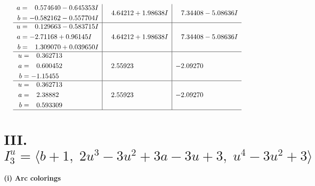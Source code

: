 \documentclass[1p]{elsarticle_modified}
\theoremstyle{definition}
\begin{document}
$$\begin{array}{c|c|c}
\begin{aligned}
a &= \phantom{-}0.574640 - 0.645353 I \\
b &= -0.582162 - 0.557704 I\end{aligned}
 & \phantom{-}4.64212 + 1.98638 I & \phantom{-}7.34408 - 5.08636 I \\ \hline\begin{aligned}
u &= \phantom{-}0.129663 - 0.583715 I \\
a &= -2.71168 + 0.96145 I \\
b &= \phantom{-}1.309070 + 0.039650 I\end{aligned}
 & \phantom{-}4.64212 + 1.98638 I & \phantom{-}7.34408 - 5.08636 I \\ \hline\begin{aligned}
u &= \phantom{-}0.362713\phantom{ +0.000000I} \\
a &= \phantom{-}0.600452\phantom{ +0.000000I} \\
b &= -1.15455\phantom{ +0.000000I}\end{aligned}
 & \phantom{-}2.55923\phantom{ +0.000000I} & -2.09270\phantom{ +0.000000I} \\ \hline\begin{aligned}
u &= \phantom{-}0.362713\phantom{ +0.000000I} \\
a &= \phantom{-}2.38882\phantom{ +0.000000I} \\
b &= \phantom{-}0.593309\phantom{ +0.000000I}\end{aligned}
 & \phantom{-}2.55923\phantom{ +0.000000I} & -2.09270\phantom{ +0.000000I}\\
 \hline 
 \end{array}$$\newpage\newpage\renewcommand{\arraystretch}{1}
\centering \section*{III. $I^u_{3}= \langle b+1,\;2 u^3-3 u^2+3 a-3 u+3,\;u^4-3 u^2+3 \rangle$}
\flushleft \textbf{(i) Arc colorings}\\
\end{document}
